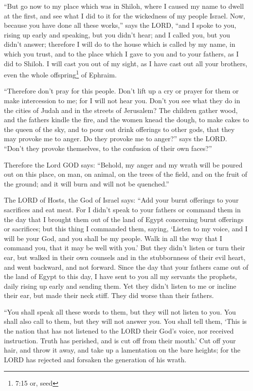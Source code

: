 \myverse{}“But go now to my place which was in Shiloh, where I caused my name to dwell at the first, and see what I did to it for the wickedness of my people Israel. \myverse{}Now, because you have done all these works,” says the LORD, “and I spoke to you, rising up early and speaking, but you didn’t hear; and I called you, but you didn’t answer; \myverse{}therefore I will do to the house which is called by my name, in which you trust, and to the place which I gave to you and to your fathers, as I did to Shiloh. \myverse{}I will cast you out of my sight, as I have cast out all your brothers, even the whole offspring\footnote{7:15 or, seed} of Ephraim.


\myverse{}“Therefore don’t pray for this people. Don’t lift up a cry or prayer for them or make intercession to me; for I will not hear you. \myverse{}Don’t you see what they do in the cities of Judah and in the streets of Jerusalem? \myverse{}The children gather wood, and the fathers kindle the fire, and the women knead the dough, to make cakes to the queen of the sky, and to pour out drink offerings to other gods, that they may provoke me to anger. \myverse{}Do they provoke me to anger?” says the LORD. “Don’t they provoke themselves, to the confusion of their own faces?”


\myverse{}Therefore the Lord GOD says: “Behold, my anger and my wrath will be poured out on this place, on man, on animal, on the trees of the field, and on the fruit of the ground; and it will burn and will not be quenched.”


\myverse{}The LORD of Hosts, the God of Israel says: “Add your burnt offerings to your sacrifices and eat meat. \myverse{}For I didn’t speak to your fathers or command them in the day that I brought them out of the land of Egypt concerning burnt offerings or sacrifices; \myverse{}but this thing I commanded them, saying, ‘Listen to my voice, and I will be your God, and you shall be my people. Walk in all the way that I command you, that it may be well with you.’ \myverse{}But they didn’t listen or turn their ear, but walked in their own counsels and in the stubbornness of their evil heart, and went backward, and not forward. \myverse{}Since the day that your fathers came out of the land of Egypt to this day, I have sent to you all my servants the prophets, daily rising up early and sending them. \myverse{}Yet they didn’t listen to me or incline their ear, but made their neck stiff. They did worse than their fathers.


\myverse{}“You shall speak all these words to them, but they will not listen to you. You shall also call to them, but they will not answer you. \myverse{}You shall tell them, ‘This is the nation that has not listened to the LORD their God’s voice, nor received instruction. Truth has perished, and is cut off from their mouth.’ \myverse{}Cut off your hair, and throw it away, and take up a lamentation on the bare heights; for the LORD has rejected and forsaken the generation of his wrath.


